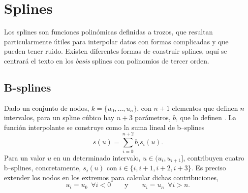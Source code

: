 \section{Splines}

Los splines son funciones polinómicas definidas a trozos, que resultan particularmente útiles para interpolar datos con formas complicadas y que pueden tener ruido. Existen diferentes formas de construir splines, aquí se centrará el texto en los \textit{basis} splines con polinomios de tercer orden.


\subsection{B-splines}

Dado un conjunto de nodos, $k = \{u_0,\dots,u_n\}$, con $n+1$ elementos que definen $n$ intervalos, para un spline cúbico hay $n+3$ parámetros, $b$, que lo definen \cite{Weisstein}. La función interpolante  se construye como la suma lineal de b--splines \cite{paperPhis}
\begin{equation}
s(u) = \sum_{i=0}^{n+2}  b_i s_i(u).
\end{equation}
%
Para un valor $u$ en un determinado intervalo, $u \in (u_i,u_{i+1}]$, contribuyen cuatro b--splines, concretamente, $s_i(u)$ con $i \in \{i,i+1,i+2,i+3\}$. Es preciso extender los nodos en los extremos para calcular dichas contribuciones,
\[u_{i} = u_0 \,\,\, \forall i<0 \qquad \text{y} \qquad u_{i} = u_{n} \,\,\, \forall i>n.\]

